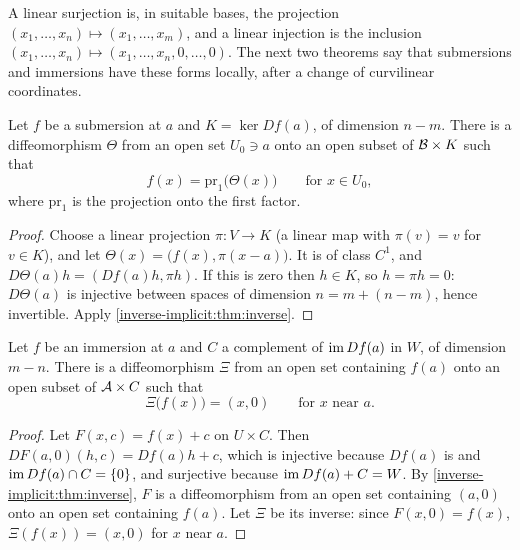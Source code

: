 \begin{notechapter}
A linear surjection is, in suitable bases, the projection
$(x_1,\dots,x_n)\mapsto(x_1,\dots,x_m)$, and a linear injection is the
inclusion $(x_1,\dots,x_n)\mapsto(x_1,\dots,x_n, 0,\dots,0)$. The next two
theorems say that submersions and immersions have these forms locally,
after a change of curvilinear coordinates.

\begin{theorem}
\label{inverse-implicit:thm:submersion}
Let $f$ be a submersion at $a$ and $K = \ker Df(a)$, of dimension
$n - m$. There is a diffeomorphism $\Theta$ from an open set $U_0\ni a$
onto an open subset of $\mathcal{B}\times K$ such that
\[
  f(x) = \mathrm{pr}_1\bigl(\Theta(x)\bigr) \qquad\text{for } x\in U_0 ,
\]
where $\mathrm{pr}_1$ is the projection onto the first factor.
\end{theorem}

\begin{proof}
Choose a linear projection $\pi:V\to K$ (a linear map with
$\pi(v) = v$ for $v\in K$), and let
$\Theta(x) = \bigl(f(x), \pi(x - a)\bigr)$. It is of class $C^1$, and
$D\Theta(a)h = (Df(a)h, \pi h)$. If this is zero then $h\in K$, so
$h = \pi h = 0$: $D\Theta(a)$ is injective between spaces of dimension
$n = m + (n - m)$, hence invertible. Apply
\cref{inverse-implicit:thm:inverse}.
\end{proof}

\begin{theorem}
\label{inverse-implicit:thm:immersion}
Let $f$ be an immersion at $a$ and $C$ a complement of $\operatorname{im} Df(a)$ in
$W$, of dimension $m - n$. There is a diffeomorphism $\Xi$ from an open
set containing $f(a)$ onto an open subset of $\mathcal{A}\times C$ such that
\[
  \Xi\bigl(f(x)\bigr) = (x, 0) \qquad\text{for } x \text{ near } a .
\]
\end{theorem}

\begin{proof}
Let $F(x, c) = f(x) + c$ on $U\times C$. Then
$DF(a, 0)(h, c) = Df(a)h + c$, which is injective because $Df(a)$ is and
$\operatorname{im} Df(a)\cap C = \{0\}$, and surjective because
$\operatorname{im} Df(a) + C = W$. By \cref{inverse-implicit:thm:inverse}, $F$ is a
diffeomorphism from an open set containing $(a, 0)$ onto an open set
containing $f(a)$. Let $\Xi$ be its inverse: since $F(x, 0) = f(x)$,
$\Xi(f(x)) = (x, 0)$ for $x$ near $a$.
\end{proof}


\end{notechapter}
